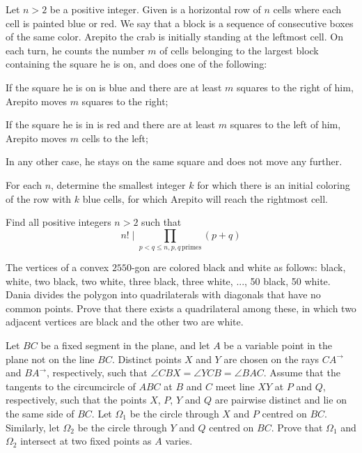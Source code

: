 \documentclass[11pt]{scrartcl}
\begin{document}
\begin{problem}[858562234779712]
Let $n> 2$ be a positive integer. Given is a horizontal row of $n$ cells where each cell is painted blue or red. We say that a block is a sequence of consecutive boxes of the same color. Arepito the crab is initially standing at the leftmost cell. On each turn, he counts the number $m$ of cells belonging to the largest block containing the square he is on, and does one of the following:

If the square he is on is blue and there are at least $m$ squares to the right of him, Arepito moves $m$ squares to the right;

If the square he is in is red and there are at least $m$ squares to the left of him, Arepito moves $m$ cells to the left;

In any other case, he stays on the same square and does not move any further.

For each $n$, determine the smallest integer $k$ for which there is an initial coloring of the row with $k$ blue cells, for which Arepito will reach the rightmost cell.
\end{problem}
\begin{problem}[6919176010062551987]
Find all positive integers $n>2$ such that
$$ n! \mid \prod_{ p<q\le n, p,q \, \text{primes}} (p+q)$$
\end{problem}
\begin{problem}[5395714337110519657]
The vertices of a convex $2550$-gon are colored black and white as follows: black, white, two black, two white, three black, three white, ..., 50 black, 50 white. Dania divides the polygon into quadrilaterals with diagonals that have no common points. Prove that there exists a quadrilateral among these, in which two adjacent vertices are black and the other two are white.
\end{problem}
\begin{problem}[423456312616928]
Let $BC$ be a fixed segment in the plane, and let $A$ be a variable point in the plane not on the line $BC$. Distinct points $X$ and $Y$ are chosen on the rays $CA^\to$ and $BA^\to$, respectively, such that $\angle CBX = \angle YCB = \angle BAC$. Assume that the tangents to the circumcircle of $ABC$ at $B$ and $C$ meet line $XY$ at $P$ and $Q$, respectively, such that the points $X$, $P$, $Y$ and $Q$ are pairwise distinct and lie on the same side of $BC$. Let $\Omega_1$ be the circle through $X$ and $P$ centred on $BC$. Similarly, let $\Omega_2$ be the circle through $Y$ and $Q$ centred on $BC$. Prove that $\Omega_1$ and $\Omega_2$ intersect at two fixed points as $A$ varies.
\end{problem}
\end{document}

